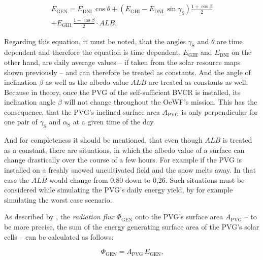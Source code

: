 \begin{center}
	\begin{equation} \label{eq:e_gen_ghi_dni}
		\begin{split}
		E_{\mathrm{GEN}} = E_{\mathrm{DNI}} \, \cos \theta + \left(E_{\mathrm{GHI}} - E_{\mathrm{DNI}} \, \sin \gamma_{\mathrm{S}}\right) \frac{1 + \cos \beta }{2} \\ 
		+ E_{\mathrm{GHI}} \, \frac{1 - \cos \beta }{2} \cdot ALB \text{.}
		\end{split}
	\end{equation}
\end{center}

Regarding this equation, it must be noted, that the angles $\gamma_{\mathrm{S}}$ and $\theta$ are time dependent and therefore the equation is time dependent. $E_{\mathrm{GHI}}$ and $E_{\mathrm{DNI}}$ on the other hand, are daily average values -- if taken from the solar resource maps shown previously -- and can therefore be treated as constants. And the angle of inclination $\beta$ as well as the albedo value $ALB$ are treated as constants as well. Because in theory, once the PVG of the self-sufficient BVCR is installed, its inclination angle $\beta$ will not change throughout the OeWF's mission. This has the consequence, that the PVG's inclined surface area $A_{\mathrm{PVG}}$ is only perpendicular for one pair of $\gamma_{\mathrm{S}}$ and $\alpha_{\mathrm{S}}$ at a given time of the day. 

And for completeness it should be mentioned, that even though $ALB$ is treated as a constant, there are situations, in which the albedo value of a surface can change drastically over the course of a few hours. For example if the PVG is installed on a freshly snowed uncultivated field and the snow melts away. In that case the $ALB$ would change from 0,80 down to 0,26. Such situations must be considered while simulating the PVG's daily energy yield, by for example simulating the worst case scenario.

As described by \cite{Mertens:2015, Wagner:2018}, the \emph{radiation flux} $\Phi_{\mathrm{GEN}}$ onto the PVG's surface area $A_{\mathrm{PVG}}$ -- to be more precise, the sum of the energy generating surface area of the PVG's solar cells -- can be calculated as follows:

\begin{center}
	\begin{equation} \label{eq:radiation_flux}
		\Phi_{\mathrm{GEN}} = A_{\mathrm{PVG}} \, E_{\mathrm{GEN}} \text{,}
	\end{equation}
\end{center}

